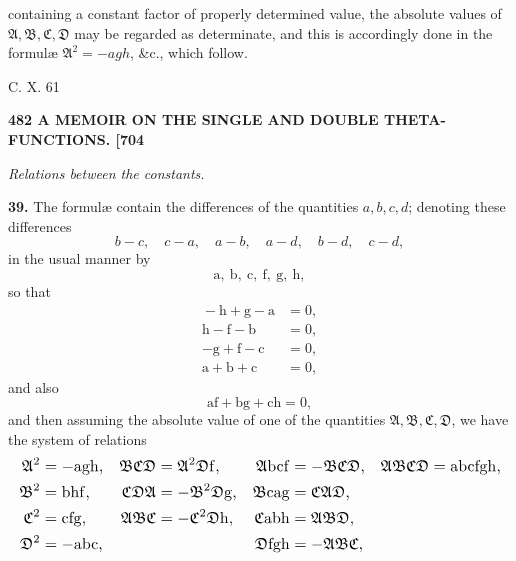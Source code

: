 \documentclass[11pt]{article}
\newcommand{\Ag}{\mathfrak{A}}
\newcommand{\Bg}{\mathfrak{B}}
\newcommand{\Cg}{\mathfrak{C}}
\newcommand{\Dg}{\mathfrak{D}}
\begin{document}
\newpage
\noindent containing a constant factor of properly determined value, the absolute values of $\Ag,\Bg,\Cg,\Dg$ may be regarded as determinate, and this is accordingly done in the formul\ae{} $\Ag^2 = -agh$, \&c., which follow.

\medskip
\hfill C. X. \hfill 61

\bigskip
\noindent\textbf{482 \hfill A MEMOIR ON THE SINGLE AND DOUBLE THETA-FUNCTIONS. \hfill [704}

\medskip
\begin{center}\textit{Relations between the constants.}\end{center}

\textbf{39.} The formul\ae{} contain the differences of the quantities $a,b,c,d$; denoting these differences
\[
b-c,\quad c-a,\quad a-b,\quad a-d,\quad b-d,\quad c-d,
\]
in the usual manner by
\[
\mathrm{a},\ \mathrm{b},\ \mathrm{c},\ \mathrm{f},\ \mathrm{g},\ \mathrm{h},
\]
so that
\[
\begin{aligned}
{}-\mathrm{h}+\mathrm{g}-\mathrm{a} &= 0,\\
\mathrm{h}-\mathrm{f}-\mathrm{b} &= 0,\\
-\mathrm{g}+\mathrm{f}-\mathrm{c} &= 0,\\
\mathrm{a}+\mathrm{b}+\mathrm{c} &= 0,
\end{aligned}
\]
and also
\[
\mathrm{a}\mathrm{f} + \mathrm{b}\mathrm{g} + \mathrm{c}\mathrm{h} = 0,
\]
and then assuming the absolute value of one of the quantities $\Ag,\Bg,\Cg,\Dg$, we have the system of relations
\[
\resizebox{\textwidth}{!}{$\displaystyle
\begin{aligned}
\Ag^2 &= -\mathrm{a}\mathrm{g}\mathrm{h}, & \Bg\Cg\Dg &= \Ag^2\Dg\mathrm{f}, & \Ag\mathrm{b}\mathrm{c}\mathrm{f} &= -\Bg\Cg\Dg, & \Ag\Bg\Cg\Dg &= \mathrm{a}\mathrm{b}\mathrm{c}\mathrm{f}\mathrm{g}\mathrm{h},\\
\Bg^2 &= \mathrm{b}\mathrm{h}\mathrm{f}, & \Cg\Dg\Ag &= -\Bg^2\Dg\mathrm{g}, & \Bg\mathrm{c}\mathrm{a}\mathrm{g} &= \Cg\Ag\Dg,\\
\Cg^2 &= \mathrm{c}\mathrm{f}\mathrm{g}, & \Ag\Bg\Cg &= -\Cg^2\Dg\mathrm{h}, & \Cg\mathrm{a}\mathrm{b}\mathrm{h} &= \Ag\Bg\Dg,\\
\Dg^2 &= -\mathrm{a}\mathrm{b}\mathrm{c}, & & & \Dg\mathrm{f}\mathrm{g}\mathrm{h} &= -\Ag\Bg\Cg,
\end{aligned}$}
\]
\end{document}
